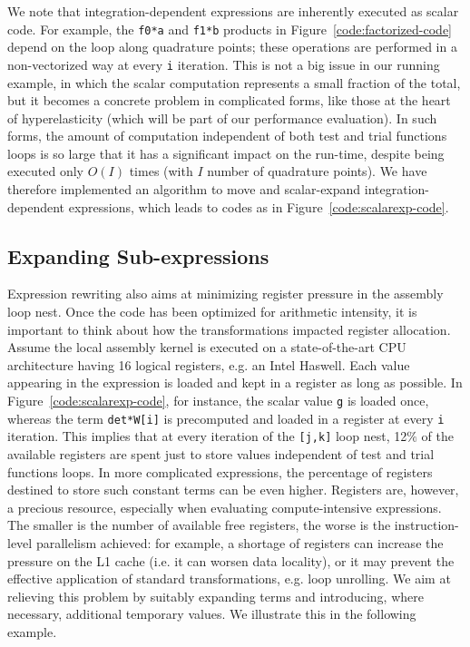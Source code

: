 We note that integration-dependent expressions are inherently executed as scalar code. For example, the \texttt{f0*a} and \texttt{f1*b} products in Figure~\ref{code:factorized-code} depend on the loop along quadrature points; these operations are performed in a non-vectorized way at every \texttt{i} iteration. This is not a big issue in our running example, in which the scalar computation represents a small fraction of the total, but it becomes a concrete problem in complicated forms, like those at the heart of hyperelasticity (which will be part of our performance evaluation). In such forms, the amount of computation independent of both test and trial functions loops is so large that it has a significant impact on the run-time, despite being executed only $O(I)$ times (with $I$ number of quadrature points). We have therefore implemented an algorithm to move and scalar-expand integration-dependent expressions, which leads to codes as in Figure~\ref{code:scalarexp-code}.

\subsection{Expanding Sub-expressions}
\label{sec:coffee-expansion}

Expression rewriting also aims at minimizing register pressure in the assembly loop nest. Once the code has been optimized for arithmetic intensity, it is important to think about how the transformations impacted register allocation. Assume the local assembly kernel is executed on a state-of-the-art CPU architecture having 16 logical registers, e.g. an Intel Haswell. Each value appearing in the expression is loaded and kept in a register as long as possible. In Figure~\ref{code:scalarexp-code}, for instance, the scalar value \texttt{g} is loaded once, whereas the term \texttt{det*W[i]} is precomputed and loaded in a register at every \texttt{i} iteration. This implies that at every iteration of the \texttt{[j,k]} loop nest, 12$\%$ of the available registers are spent just to store values independent of test and trial functions loops. In more complicated expressions, the percentage of registers destined to store such constant terms can be even higher. Registers are, however, a precious resource, especially when evaluating compute-intensive expressions. The smaller is the number of available free registers, the worse is the instruction-level parallelism achieved: for example, a shortage of registers can increase the pressure on the L1 cache (i.e. it can worsen data locality), or it may prevent the effective application of standard transformations, e.g. loop unrolling. We aim at relieving this problem by suitably expanding terms and introducing, where necessary, additional temporary values. We illustrate this in the following example.

